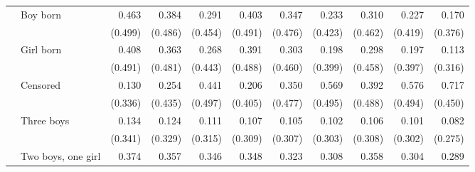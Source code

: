 \documentclass[12pt,letterpaper]{article}
\begin{document}
\begin{table}
\begin{center}
\begin{scriptsize}
\begin{threeparttable}
\begin{tabular} {@{} c l D{.}{.}{1.3} D{.}{.}{1.3} D{.}{.}{1.3} D{.}{.}{1.3} D{.}{.}{1.3} D{.}{.}{1.3} D{.}{.}{1.3} D{.}{.}{1.3} D{.}{.}{1.3} @{}}
\addlinespace
\midrule
{}
                    & Boy born            &       0.463         &       0.384         &       0.291         &       0.403         &       0.347         &       0.233         &       0.310         &       0.227         &       0.170         \\
                    &                     &     (0.499)         &     (0.486)         &     (0.454)         &     (0.491)         &     (0.476)         &     (0.423)         &     (0.462)         &     (0.419)         &     (0.376)         \\
                    & Girl born           &       0.408         &       0.363         &       0.268         &       0.391         &       0.303         &       0.198         &       0.298         &       0.197         &       0.113         \\
                    &                     &     (0.491)         &     (0.481)         &     (0.443)         &     (0.488)         &     (0.460)         &     (0.399)         &     (0.458)         &     (0.397)         &     (0.316)         \\
                    & Censored            &       0.130         &       0.254         &       0.441         &       0.206         &       0.350         &       0.569         &       0.392         &       0.576         &       0.717         \\
                    &                     &     (0.336)         &     (0.435)         &     (0.497)         &     (0.405)         &     (0.477)         &     (0.495)         &     (0.488)         &     (0.494)         &     (0.450)         \\
                    & Three boys          &       0.134         &       0.124         &       0.111         &       0.107         &       0.105         &       0.102         &       0.106         &       0.101         &       0.082         \\
                    &                     &     (0.341)         &     (0.329)         &     (0.315)         &     (0.309)         &     (0.307)         &     (0.303)         &     (0.308)         &     (0.302)         &     (0.275)         \\
                    & Two boys, one girl  &       0.374         &       0.357         &       0.346         &       0.348         &       0.323         &       0.308         &       0.358         &       0.304         &       0.289         \\

\end{tabular}
\end{threeparttable}
\end{scriptsize}
\end{center}
\end{table}
\end{document}
